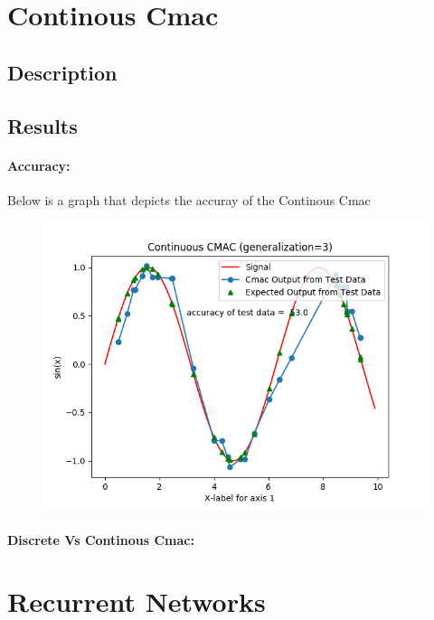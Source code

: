 \documentclass{article}
\begin{document}
\section{Continous Cmac}
\subsection{Description}
\subsection{Results}
  \paragraph{Accuracy:}
    Below is a graph that depicts the accuray of the Continous Cmac
  \begin{figure}[h]
     \includegraphics[scale=0.65]{./Data/Accuracy/continousAccuracy.png}
  \end{figure}
  \paragraph{Discrete Vs Continous Cmac:}
\section{Recurrent Networks}
\end{document}
